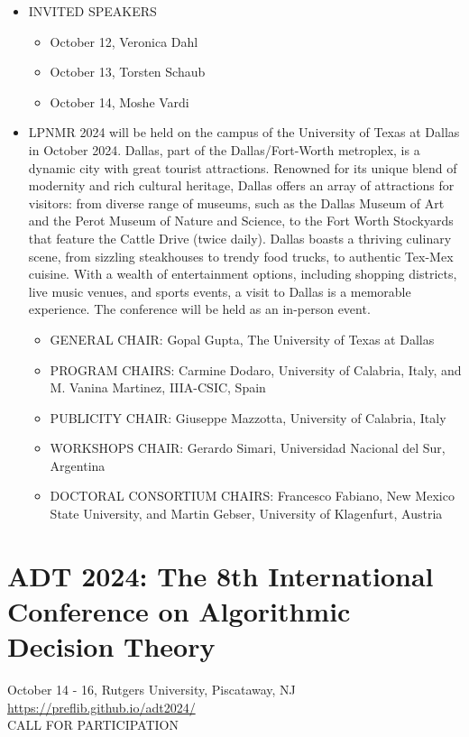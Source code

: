 \documentclass[prodmode,acmtecs]{acmsmall} %
\begin{document}
\begin{itemize}
\item  INVITED SPEAKERS 
 
\begin{itemize}\item  October 12, Veronica Dahl
\item  October 13, Torsten Schaub
\item  October 14, Moshe Vardi
\end{itemize} 
\item  LPNMR 2024 will be held on the campus of the University of Texas at Dallas in October 2024. Dallas, part of the Dallas/Fort-Worth metroplex, is a dynamic city with great tourist attractions. Renowned for its unique blend of modernity and rich cultural heritage, Dallas offers an array of attractions for visitors: from diverse range of museums, such as the Dallas Museum of Art and the Perot Museum of Nature and Science, to the Fort Worth Stockyards that feature the Cattle Drive (twice daily). Dallas boasts a thriving culinary scene, from sizzling steakhouses to trendy food trucks, to authentic Tex-Mex cuisine. With a wealth of entertainment options, including shopping districts, live music venues, and sports events, a visit to Dallas is a memorable experience. The conference will be held as an in-person event. 
 
\begin{itemize}\item  GENERAL CHAIR: Gopal Gupta, The University of Texas at Dallas
\item  PROGRAM CHAIRS: Carmine Dodaro, University of Calabria, Italy, and  M. Vanina Martinez, IIIA-CSIC, Spain
\item  PUBLICITY CHAIR: Giuseppe Mazzotta, University of Calabria, Italy
\item  WORKSHOPS CHAIR: Gerardo Simari, Universidad Nacional del Sur, Argentina
\item  DOCTORAL CONSORTIUM CHAIRS: Francesco Fabiano, New Mexico State University, and Martin Gebser, University of Klagenfurt, Austria   
\end{itemize} 
\end{itemize}\section{ADT 2024: The 8th International Conference on Algorithmic Decision Theory}\label{ADT2024}  October 14 - 16, Rutgers University, Piscataway, NJ\\ 
  \href{https://preflib.github.io/adt2024/}{https://preflib.github.io/adt2024/}\\ 
CALL FOR PARTICIPATION 
\end{document}
